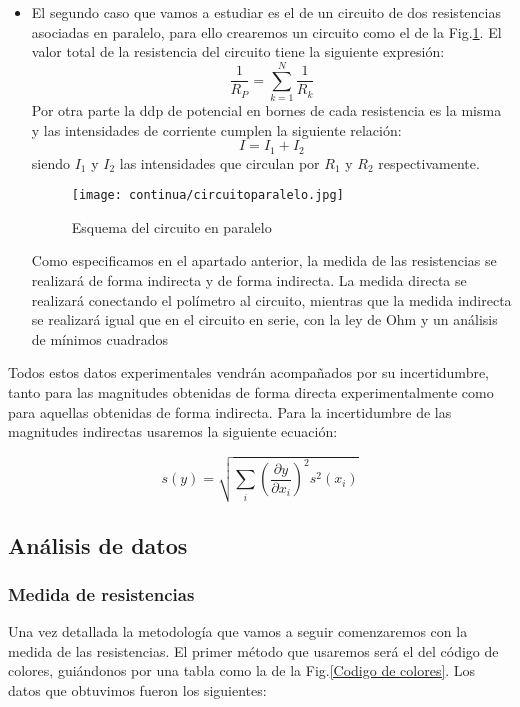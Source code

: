 \documentclass[a4paper,12pt,titlepage]{article}
\begin{document}
\begin{itemize}
    \item El segundo caso que vamos a estudiar es el de un circuito de dos resistencias asociadas en paralelo, para ello crearemos un circuito como el de la Fig.\ref{CircuitoParalelo}. El valor total de la resistencia del circuito tiene la siguiente expresión:
    \begin{equation}
        \frac{1}{R_{P}}=\sum_{k=1}^N\frac{1}{R_{k}}
        \label{Resistencias en paralelo}
    \end{equation}
    Por otra parte la ddp de potencial en bornes de cada resistencia es la misma y las intensidades de corriente cumplen la siguiente relación:
    \begin{equation}
        I=I_{1}+I_{2}
        \label{Formula I paralelo}
    \end{equation}
    siendo $I_{1}$ y $I_{2}$ las intensidades que circulan por $R_{1}$ y $R_{2}$ respectivamente.
    \begin{figure}[h!]
        \centering
        \texttt{[image: continua/circuitoparalelo.jpg]}
        \caption{Esquema del circuito en paralelo}
        \label{CircuitoParalelo}
    \end{figure}
    \par Como especificamos en el apartado anterior, la medida de las resistencias se realizará de forma indirecta y de forma indirecta. La medida directa se realizará conectando el polímetro al circuito, mientras que la medida indirecta se realizará igual que en el circuito en serie, con la ley de Ohm y un análisis de mínimos cuadrados
\end{itemize}

Todos estos datos experimentales vendrán acompañados por su incertidumbre, tanto para las magnitudes obtenidas de forma directa experimentalmente como para aquellas obtenidas de forma indirecta. Para la incertidumbre de las magnitudes indirectas usaremos la siguiente ecuación:

\begin{equation}
    s(y)=\sqrt{\sum_{i}\left(\frac{\partial y}{\partial x_{i}}\right)^2 s^2(x_{i})}
    \label{Incertidumbre indirecta}
\end{equation}

\subsection{Análisis de datos}

\subsubsection{Medida de resistencias}
Una vez detallada la metodología que vamos a seguir comenzaremos con la medida de las resistencias. El primer método que usaremos será el del código de colores, guiándonos por una tabla como la de la Fig.\ref{Codigo de colores}. Los datos que obtuvimos fueron los siguientes:
\end{document}
